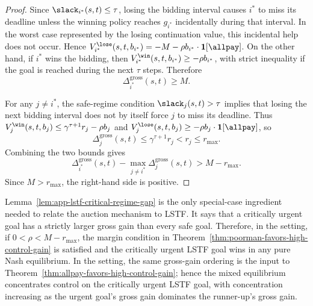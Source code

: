 \begin{proof}
  Since \(\slack_{i^*}(s,t)\leq \tau\), losing the bidding interval causes \(i^*\) to miss its deadline unless the winning policy reaches \(g_{i^*}\) incidentally during that interval.
  In the worst case represented by the losing continuation value, this incidental help does not occur.
  Hence \(V_{i^*}^{\lose}(s,t,b_{i^*})=-M-\rho b_{i^*}\cdot\mathbf{1}[\text{\allpay}]\).
  On the other hand, if \(i^*\) wins the bidding, then \(V_{i^*}^{\win}(s,t,b_{i^*})\geq -\rho b_{i^*}\), with strict inequality if the goal is reached during the next \(\tau\) steps.
  Therefore
  \[
    \Delta_{i^*}^{\mathrm{gross}}(s,t)\geq M.
  \]

  For any \(j\neq i^*\), the safe-regime condition \(\slack_j(s,t)>\tau\) implies that losing the next bidding interval does not by itself force \(j\) to miss its deadline.
  Thus \(V_j^{\win}(s,t,b_j)\leq \gamma^{\tau+1}r_j-\rho b_j\) and \(V_j^{\lose}(s,t,b_j)\geq-\rho b_j\cdot\mathbf{1}[\text{\allpay}]\), so
  \[
    \Delta_j^{\mathrm{gross}}(s,t)
    \leq
    \gamma^{\tau+1}r_j
    < r_j
    \leq r_{\max}.
  \]
  Combining the two bounds gives
  \[
    \Delta_{i^*}^{\mathrm{gross}}(s,t)-\max_{j\neq i^*}\Delta_j^{\mathrm{gross}}(s,t)
    > M-r_{\max}.
  \]
  Since \(M>r_{\max}\), the right-hand side is positive.
\end{proof}

Lemma~\ref{lem:app-lstf-critical-regime-gap} is the only special-case ingredient needed to relate the auction mechanism to LSTF.
It says that a critically urgent goal has a strictly larger gross gain than every safe goal.
Therefore, in the \poorman setting, if \(0<\rho<M-r_{\max}\), the margin condition in Theorem~\ref{thm:poorman-favors-high-control-gain} is satisfied and the critically urgent LSTF goal wins in any pure Nash equilibrium.
In the \allpay setting, the same gross-gain ordering is the input to Theorem~\ref{thm:allpay-favors-high-control-gain}; hence the mixed equilibrium concentrates control on the critically urgent LSTF goal, with concentration increasing as the urgent goal's gross gain dominates the runner-up's gross gain.
